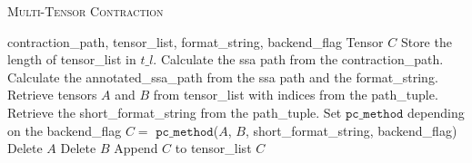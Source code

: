 \begin{algorithm}[H]
    \caption{\textsc{Multi-Tensor Contraction}}
    \label{alg:mtc}
    \begin{algorithmic}[1]
        \REQUIRE  contraction\_path,  tensor\_list, format\_string, backend\_flag 
        \ENSURE Tensor $C$
        \STATE Store the length of tensor\_list in   $t\_l$.
        \STATE Calculate the ssa path from the contraction\_path.
        \STATE Calculate the annotated\_ssa\_path from the ssa path and the format\_string. 
        \STATE Retrieve tensors $A$ and $B$ from tensor\_list with indices from the path\_tuple.
        \STATE  Retrieve the short\_format\_string from the path\_tuple.
        \STATE Set $\texttt{pc\_method}$ depending on the backend\_flag 
        \STATE  $C =$ $\texttt{pc\_method}$($A$, $B$, short\_format\_string, backend\_flag) 
        \STATE Delete $ A$ 
        \ENDIF
        \STATE Delete $ B$ 
        \ENDIF
        \STATE Append $ C $ to tensor\_list 
        \ENDFOR
        \RETURN  $C$ 
    \end{algorithmic}
\end{algorithm}
